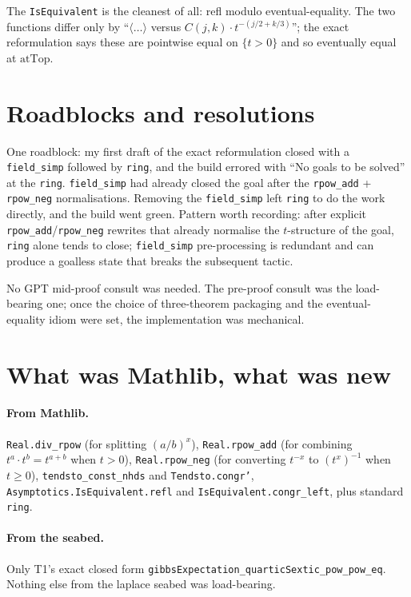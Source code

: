 \documentclass[11pt]{article}
\begin{document}
The \texttt{IsEquivalent} is the cleanest of all: refl modulo
eventual-equality. The two functions differ only by
``$\langle\dots\rangle$ versus $C(j, k) \cdot t^{-(j/2+k/3)}$''; the
exact reformulation says these are pointwise equal on $\{t > 0\}$
and so eventually equal at $\mathrm{atTop}$.

\section{Roadblocks and resolutions}

One roadblock: my first draft of the exact reformulation closed with
a \texttt{field\_simp} followed by \texttt{ring}, and the build
errored with ``No goals to be solved'' at the \texttt{ring}.
\texttt{field\_simp} had already closed the goal after the
\texttt{rpow\_add} + \texttt{rpow\_neg} normalisations. Removing the
\texttt{field\_simp} left \texttt{ring} to do the work directly, and
the build went green. Pattern worth recording: after explicit
\texttt{rpow\_add}/\texttt{rpow\_neg} rewrites that already normalise
the $t$-structure of the goal, \texttt{ring} alone tends to close;
\texttt{field\_simp} pre-processing is redundant and can produce a
goalless state that breaks the subsequent tactic.

No GPT mid-proof consult was needed. The pre-proof consult was the
load-bearing one; once the choice of three-theorem packaging and the
eventual-equality idiom were set, the implementation was mechanical.

\section{What was Mathlib, what was new}

\paragraph{From Mathlib.}
\texttt{Real.div\_rpow} (for splitting $(a/b)^x$),
\texttt{Real.rpow\_add} (for combining $t^a \cdot t^b = t^{a+b}$ when
$t > 0$), \texttt{Real.rpow\_neg} (for converting $t^{-x}$ to
$(t^x)^{-1}$ when $t \ge 0$),
\texttt{tendsto\_const\_nhds} and \texttt{Tendsto.congr'},
\texttt{Asymptotics.IsEquivalent.refl} and
\texttt{IsEquivalent.congr\_left}, plus standard \texttt{ring}.

\paragraph{From the seabed.} Only T1's exact closed form
\texttt{gibbsExpectation\_quarticSextic\_pow\_pow\_eq}. Nothing else
from the laplace seabed was load-bearing.
\end{document}
